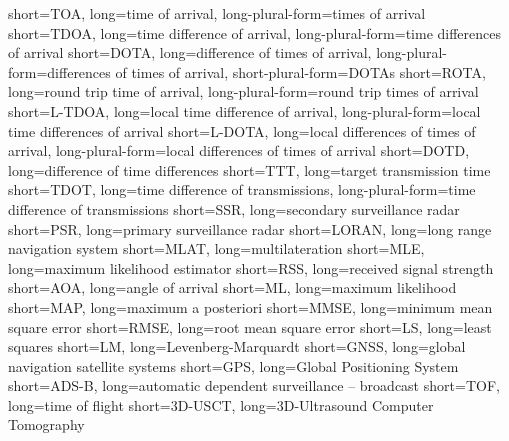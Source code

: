 		{short={TOA},		        long={time of arrival}, long-plural-form={times of arrival}}
		{short={TDOA},		      long={time difference of arrival}, long-plural-form={time differences of arrival}}
		{short={DOTA},		      long={difference of times of arrival}, long-plural-form={differences of times of arrival}, short-plural-form={DOTAs}}
		{short={ROTA},		      long={round trip time of arrival}, long-plural-form={round trip times of arrival}}
	{short={L\hbox{-}TDOA},	long={local time difference of arrival}, long-plural-form={local time differences of arrival}}
	{short={L\hbox{-}DOTA},	long={local differences of times of arrival}, long-plural-form={local differences of times of arrival}}
		{short={DOTD},		      long={difference of time differences}}
		{short={TTT},		        long={target transmission time}}
		{short={TDOT},		      long={time difference of transmissions}, long-plural-form={time difference of transmissions}}
		{short={SSR},	    	    long={secondary surveillance radar}}
		{short={PSR},	    	    long={primary surveillance radar}}
	{short={LORAN},	    	  long={long range navigation system}}
		{short={MLAT},	    	  long={multilateration}}
		{short={MLE},	    	    long={maximum likelihood estimator}}
		{short={RSS},	    	    long={received signal strength}}
		{short={AOA},	    	    long={angle of arrival}}
		  {short={ML},	    	    long={maximum likelihood}}
	  {short={MAP},	    	    long={maximum a posteriori}}
		{short={MMSE},	    	  long={minimum mean square error}}
		{short={RMSE},	    	  long={root mean square error}}
		  {short={LS},	    	    long={least squares}}
		  {short={LM},	    	    long={Levenberg-Marquardt}}
		{short={GNSS},	    	  long={global navigation satellite systems}}
		{short={GPS},	    	    long={Global Positioning System}}
		{short={ADS-B},	    	  long={automatic dependent surveillance -- broadcast}}
		{short={TOF},	    	    long={time of flight}}
	{short={3D-USCT},	  	  long={3D-Ultrasound Computer Tomography}}
